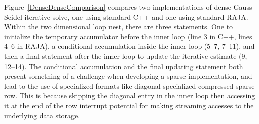 Figure~\ref{DenseDenseComparison} compares two implementations of dense Gauss-Seidel iterative solve, one using standard C++ and one using standard RAJA\@.
Within the two dimensional loop nest, there are three statements. 
One to initialize the temporary accumulator before the inner loop (line 3 in C++, lines 4--6 in RAJA), a conditional accumulation inside the inner loop (5--7, 7--11), and then a final statement after the inner loop to update the iterative estimate (9, 12--14).
The conditional accumulation and the final updating statement both present something of a challenge when developing a sparse implementation, and lead to the use of specialized formats like diagonal specialized compressed sparse row.
This is because skipping the diagonal entry in the inner loop then accessing it at the end of the row interrupt potential for making streaming accesses to the underlying data storage.

